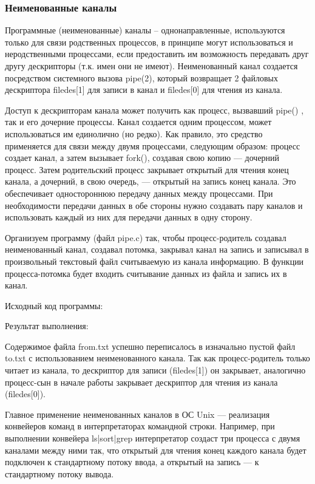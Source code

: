 \documentclass[a4paper]{article}
\begin{document}
	\subsubsection{Неименованные каналы}
	Программные (неименованные) каналы – однонаправленные, используются только для связи родственных процессов, в принципе могут использоваться и неродственными процессами, если предоставить им возможность передавать друг другу дескрипторы (т.к. имен они не имеют). Неименованный канал создается посредством системного вызова pipe(2), который возвращает 2 файловых дескриптора filedes[1] для записи в канал и filedes[0] для чтения из канала.
	
	Доступ к дескрипторам канала может получить как процесс, вызвавший pipe() , так и его дочерние процессы. Канал создается одним процессом, может использоваться им единолично (но редко). Как правило, это средство применяется для связи между двумя процессами, следующим образом: процесс создает канал, а затем вызывает fork(), создавая свою копию — дочерний процесс. Затем родительский процесс закрывает открытый для чтения конец канала, а дочерний, в свою очередь, — открытый на запись конец канала. Это обеспечивает одностороннюю передачу данных между процессами. При необходимости передачи данных в обе стороны нужно создавать пару каналов и использовать каждый из них для передачи данных в одну сторону.
	
	Организуем программу (файл pipe.c) так, чтобы процесс-родитель создавал неименованный канал, создавал потомка, закрывал канал на запись и записывал в произвольный текстовый файл считываемую из канала информацию. В функции процесса-потомка будет входить считывание данных из файла и запись их в канал.
	
	Исходный код программы:
	
	
	Результат выполнения:
	

	Содержимое файла from.txt успешно переписалось в изначально пустой файл to.txt с использованием неименованного канала.	Так как процесс-родитель только читает из канала, то дескриптор для записи (filedes[1]) он закрывает, аналогично процесс-сын в начале работы закрывает дескриптор для чтения из канала (filedes[0]).

	Главное применение неименованных каналов в ОС Unix --– реализация конвейеров команд в интерпретаторах командной строки. Например, при выполнении конвейера ls|sort|grep интерпретатор создаст три процесса с двумя каналами между ними так, что открытый для чтения конец каждого канала будет подключен к стандартному потоку ввода, а открытый на запись — к стандартному потоку вывода.
	
\end{document}
